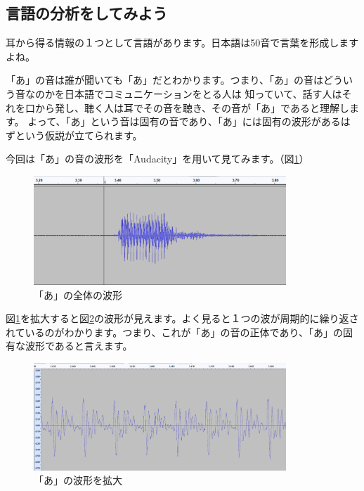 \documentclass[11pt,b5paper,papersize,dvipdfmx]{jsbook}
\begin{document}
%
\subsection{言語の分析をしてみよう}
耳から得る情報の１つとして言語があります。日本語は50音で言葉を形成しますよね。\par
「あ」の音は誰が聞いても「あ」だとわかります。つまり、「あ」の音はどういう音なのかを日本語でコミュニケーションをとる人は
知っていて、話す人はそれを口から発し、聴く人は耳でその音を聴き、その音が「あ」であると理解します。
よって、「あ」という音は固有の音であり、「あ」には固有の波形があるはずという仮説が立てられます。\par
今回は「あ」の音の波形を「Audacity」を用いて見てみます。（図\ref{fig:asaisho}）
\begin{figure}[H]
    \begin{center}
      \includegraphics[width=9.5cm]{nsmr/img/a.png}
    \end{center}
    \caption{「あ」の全体の波形}
    \label{fig:asaisho}
\end{figure}
図\ref{fig:asaisho}を拡大すると図\ref{fig:aato}の波形が見えます。よく見ると１つの波が周期的に繰り返されているのがわかります。つまり、これが「あ」の音の正体であり、「あ」の固有な波形であると言えます。
\begin{figure}[H]
    \begin{center}
      \includegraphics[width=9.5cm]{nsmr/img/a2.png}
    \end{center}
    \caption{「あ」の波形を拡大}
    \label{fig:aato}
\end{figure}
\end{document}
